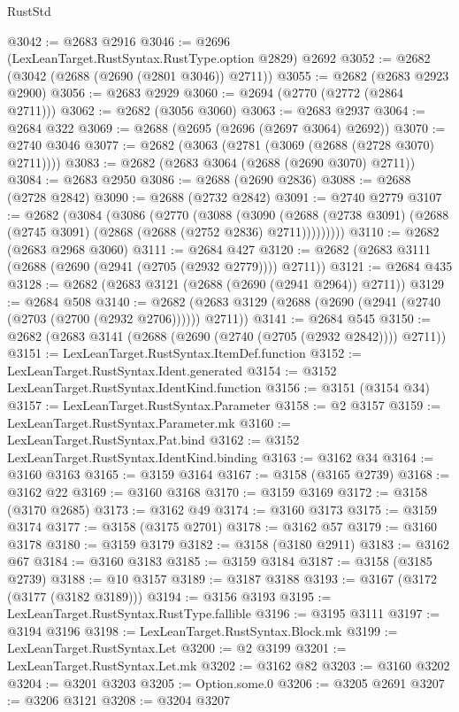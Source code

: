 \begin{lexlean}{RustStd}
\begin{coremodule}
{\begin{coremodule}
{{{{{{{{{{{{{{{{{{{{{{{{{@3042 := @2683 @2916
@3046 := @2696 (LexLeanTarget.RustSyntax.RustType.option @2829) @2692
@3052 := @2682 (@3042 (@2688 (@2690 (@2801 @3046)) @2711))
@3055 := @2682 (@2683 @2923 @2900)
@3056 := @2683 @2929
@3060 := @2694 (@2770 (@2772 (@2864 @2711)))
@3062 := @2682 (@3056 @3060)
@3063 := @2683 @2937
@3064 := @2684 @322
@3069 := @2688 (@2695 (@2696 (@2697 @3064) @2692))
@3070 := @2740 @3046
@3077 := @2682 (@3063 (@2781 (@3069 (@2688 (@2728 @3070) @2711))))
@3083 := @2682 (@2683 @3064 (@2688 (@2690 @3070) @2711))
@3084 := @2683 @2950
@3086 := @2688 (@2690 @2836)
@3088 := @2688 (@2728 @2842)
@3090 := @2688 (@2732 @2842)
@3091 := @2740 @2779
@3107 := @2682
    (@3084
      (@3086
        (@2770
          (@3088
            (@3090
              (@2688 (@2738 @3091) (@2688 (@2745 @3091) (@2868 (@2688 (@2752 @2836) @2711)))))))))
@3110 := @2682 (@2683 @2968 @3060)
@3111 := @2684 @427
@3120 := @2682 (@2683 @3111 (@2688 (@2690 (@2941 (@2705 (@2932 @2779)))) @2711))
@3121 := @2684 @435
@3128 := @2682 (@2683 @3121 (@2688 (@2690 (@2941 @2964)) @2711))
@3129 := @2684 @508
@3140 := @2682 (@2683 @3129 (@2688 (@2690 (@2941 (@2740 (@2703 (@2700 (@2932 @2706)))))) @2711))
@3141 := @2684 @545
@3150 := @2682 (@2683 @3141 (@2688 (@2690 (@2740 (@2705 (@2932 @2842)))) @2711))
@3151 := LexLeanTarget.RustSyntax.ItemDef.function
@3152 := LexLeanTarget.RustSyntax.Ident.generated
@3154 := @3152 LexLeanTarget.RustSyntax.IdentKind.function
@3156 := @3151 (@3154 @34)
@3157 := LexLeanTarget.RustSyntax.Parameter
@3158 := @2 @3157
@3159 := LexLeanTarget.RustSyntax.Parameter.mk
@3160 := LexLeanTarget.RustSyntax.Pat.bind
@3162 := @3152 LexLeanTarget.RustSyntax.IdentKind.binding
@3163 := @3162 @34
@3164 := @3160 @3163
@3165 := @3159 @3164
@3167 := @3158 (@3165 @2739)
@3168 := @3162 @22
@3169 := @3160 @3168
@3170 := @3159 @3169
@3172 := @3158 (@3170 @2685)
@3173 := @3162 @49
@3174 := @3160 @3173
@3175 := @3159 @3174
@3177 := @3158 (@3175 @2701)
@3178 := @3162 @57
@3179 := @3160 @3178
@3180 := @3159 @3179
@3182 := @3158 (@3180 @2911)
@3183 := @3162 @67
@3184 := @3160 @3183
@3185 := @3159 @3184
@3187 := @3158 (@3185 @2739)
@3188 := @10 @3157
@3189 := @3187 @3188
@3193 := @3167 (@3172 (@3177 (@3182 @3189)))
@3194 := @3156 @3193
@3195 := LexLeanTarget.RustSyntax.RustType.fallible
@3196 := @3195 @3111
@3197 := @3194 @3196
@3198 := LexLeanTarget.RustSyntax.Block.mk
@3199 := LexLeanTarget.RustSyntax.Let
@3200 := @2 @3199
@3201 := LexLeanTarget.RustSyntax.Let.mk
@3202 := @3162 @82
@3203 := @3160 @3202
@3204 := @3201 @3203
@3205 := Option.some.{0}
@3206 := @3205 @2691
@3207 := @3206 @3121
@3208 := @3204 @3207
}}}}}}}}}}}}}}}}}}}}}}}}}
\end{coremodule}}
\end{coremodule}
\end{lexlean}
